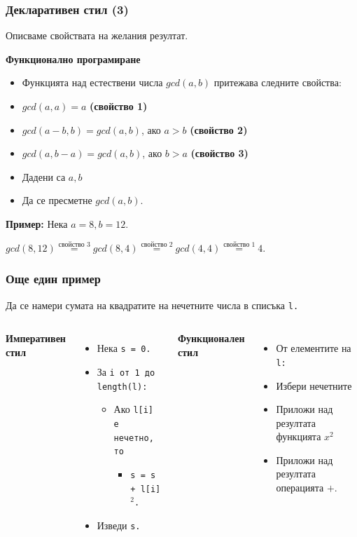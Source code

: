 \documentclass{beamer}
\begin{document}
\begin{frame}
  \frametitle{Декларативен стил (3)}

  Описваме свойствата на желания резултат.
  \vspace{1em}

  \textbf{Функционално програмиране}

  \begin{itemize}
  \item Функцията над естествени числа $gcd(a,b)$ притежава следните свойства:
  \item $gcd(a,a) = a$ \textbf{(свойство 1)}
  \item $gcd(a-b,b) = gcd(a,b)$, ако $a > b$ \textbf{(свойство 2)}
  \item $gcd(a,b-a) = gcd(a,b)$, ако $b > a$ \textbf{(свойство 3)}
  \item Дадени са $a, b$
  \item Да се пресметне $gcd(a,b)$.
  \end{itemize}

  \pause

  \textbf{Пример:}
  Нека $a = 8, b = 12$.

  $gcd(8,12) \stackrel{\text{свойство 3}}= gcd(8,4) \stackrel{\text{свойство 2}}= gcd(4,4) \stackrel{\text{свойство 1}}= 4$.
\end{frame}

\begin{frame}
  \frametitle{Още един пример}

  Да се намери сумата на квадратите на нечетните числа в списъка \tt l.

  \begin{columns}[t,onlytextwidth]

    \textbf{Императивен стил}
    \begin{itemize}
    \item Нека \tt{s = 0}.
    \item За \tt i от 1 до \tt{length(l)}:
      \begin{itemize}
      \item Ако \tt{l[i]} е нечетно, то
        \begin{itemize}
        \item \tt{s = s + l[i]$^2$}.
        \end{itemize}
      \end{itemize}
    \item Изведи \tt s.
    \end{itemize}


    \textbf{Функционален стил}

    \begin{itemize}
    \item От елементите на \tt l:
    \item Избери нечетните
    \item Приложи над резултата функцията $x^2$
    \item Приложи над резултата операцията $+$.
    \end{itemize}
  \end{columns}
\end{frame}
\end{document}
